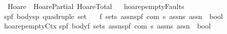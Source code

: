 %
\begin{isabellebody}%
%
%
\isamarkuptrue%
%
\isadelimtheory
%
\endisadelimtheory
%
\isatagtheory
{}\isamarkupfalse%
\ Hoare\ \ HoarePartial\ HoareTotal\ %
\endisatagtheory
{\isafoldtheory}%
%
\isadelimtheory
%
\endisadelimtheory
\isanewline
\isanewline
\isanewline
{}\isamarkupfalse%
\ \isanewline
\isanewline
{\isachardoublequoteopen}{\isacharunderscore}hoarep{\isacharunderscore}emptyFaults{\isachardoublequoteclose}{\isacharcolon}{\isacharcolon}\isanewline
{\isachardoublequoteopen}{\isacharbrackleft}{\isacharparenleft}{\isacharprime}s{\isacharcomma}{\isacharprime}p{\isacharcomma}{\isacharprime}f{\isacharparenright}\ body{\isacharcomma}{\isacharparenleft}{\isacharprime}s{\isacharcomma}{\isacharprime}p{\isacharparenright}\ quadruple\ set{\isacharcomma}\isanewline
\ \ \ {\isacharprime}f\ set{\isacharcomma}{\isacharprime}s\ assn{\isacharcomma}{\isacharparenleft}{\isacharprime}s{\isacharcomma}{\isacharprime}p{\isacharcomma}{\isacharprime}f{\isacharparenright}\ com{\isacharcomma}\ {\isacharprime}s\ assn{\isacharcomma}{\isacharprime}s\ assn{\isacharbrackright}\ {\isacharequal}{\isachargreater}\ bool{\isachardoublequoteclose}\isanewline
\ \ \ \ {\isacharparenleft}{\isachardoublequoteopen}{\isacharparenleft}{}{\isacharunderscore}{\isacharcomma}{\isacharunderscore}{\isacharslash}{\isasymturnstile}\ {\isacharparenleft}{\isacharunderscore}{\isacharslash}\ {\isacharparenleft}{\isacharunderscore}{\isacharparenright}{\isacharslash}\ {\isacharunderscore}{\isacharcomma}{\isacharslash}{\isacharunderscore}{\isacharparenright}{\isacharparenright}{\isachardoublequoteclose}\ {\isacharbrackleft}{}{}{\isacharcomma}{}{}{\isacharcomma}{}{}{}{}{\isacharcomma}{}{}{\isacharcomma}{}{}{}{}{\isacharcomma}{}{}{}{}{\isacharbrackright}{}{}{\isacharparenright}\isanewline
\isanewline
{\isachardoublequoteopen}{\isacharunderscore}hoarep{\isacharunderscore}emptyCtx{\isachardoublequoteclose}{\isacharcolon}{\isacharcolon}\isanewline
{\isachardoublequoteopen}{\isacharbrackleft}{\isacharparenleft}{\isacharprime}s{\isacharcomma}{\isacharprime}p{\isacharcomma}{\isacharprime}f{\isacharparenright}\ body{\isacharcomma}{\isacharprime}f\ set{\isacharcomma}{\isacharprime}s\ assn{\isacharcomma}{\isacharparenleft}{\isacharprime}s{\isacharcomma}{\isacharprime}p{\isacharcomma}{\isacharprime}f{\isacharparenright}\ com{\isacharcomma}\ {\isacharprime}s\ assn{\isacharcomma}{\isacharprime}s\ assn{\isacharbrackright}\ {\isacharequal}{\isachargreater}\ bool{\isachardoublequoteclose}\isanewline

\end{isabellebody}
